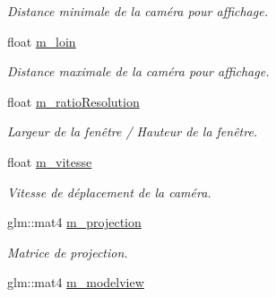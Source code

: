\begin{DoxyCompactItemize}
\begin{DoxyCompactList}\small\item\em Distance minimale de la caméra pour affichage. \end{DoxyCompactList}\item 
\hypertarget{classAbstractCamera_a29c540279b97ed810fdd7afd65bf6b4e}{float \hyperlink{classAbstractCamera_a29c540279b97ed810fdd7afd65bf6b4e}{m\-\_\-loin}}\label{classAbstractCamera_a29c540279b97ed810fdd7afd65bf6b4e}

\begin{DoxyCompactList}\small\item\em Distance maximale de la caméra pour affichage. \end{DoxyCompactList}\item 
\hypertarget{classAbstractCamera_ac4dccb042e77bb91c2aa66a315112043}{float \hyperlink{classAbstractCamera_ac4dccb042e77bb91c2aa66a315112043}{m\-\_\-ratio\-Resolution}}\label{classAbstractCamera_ac4dccb042e77bb91c2aa66a315112043}

\begin{DoxyCompactList}\small\item\em Largeur de la fenêtre / Hauteur de la fenêtre. \end{DoxyCompactList}\item 
\hypertarget{classAbstractCamera_a554f06bd5f27d68700f844cc4e6b7dba}{float \hyperlink{classAbstractCamera_a554f06bd5f27d68700f844cc4e6b7dba}{m\-\_\-vitesse}}\label{classAbstractCamera_a554f06bd5f27d68700f844cc4e6b7dba}

\begin{DoxyCompactList}\small\item\em Vitesse de déplacement de la caméra. \end{DoxyCompactList}\item 
\hypertarget{classAbstractCamera_aa99260e08a54ece7bcfc81ca44baf82c}{glm\-::mat4 \hyperlink{classAbstractCamera_aa99260e08a54ece7bcfc81ca44baf82c}{m\-\_\-projection}}\label{classAbstractCamera_aa99260e08a54ece7bcfc81ca44baf82c}

\begin{DoxyCompactList}\small\item\em Matrice de projection. \end{DoxyCompactList}\item 
\hypertarget{classAbstractCamera_aa26d2fe7b5921b46c5721e17e3a05c15}{glm\-::mat4 \hyperlink{classAbstractCamera_aa26d2fe7b5921b46c5721e17e3a05c15}{m\-\_\-modelview}}\label{classAbstractCamera_aa26d2fe7b5921b46c5721e17e3a05c15}


\end{DoxyCompactItemize}
